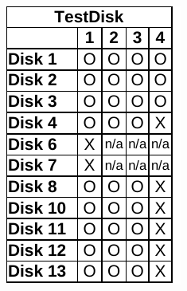 \begin{paraphrase}
\begin{figure}
\begin{subfigure}{0.17\linewidth}
        \includegraphics[width=\linewidth]{fig/testdisk_results_ntfs.pdf}
    \end{subfigure}~~
    \begin{subfigure}{0.17\linewidth}

\end{subfigure}
\end{figure}
\end{paraphrase}
